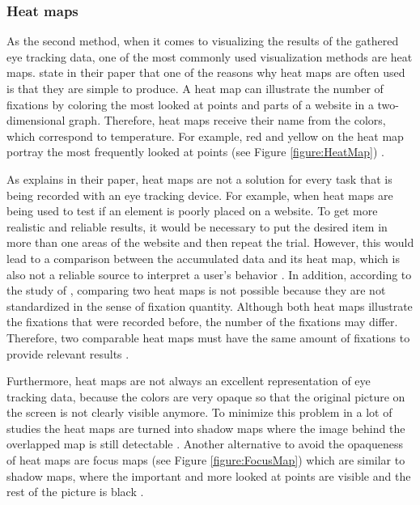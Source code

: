\subsubsection{Heat maps}
As the second method, when it comes to visualizing the results of the gathered eye tracking data, one of the most commonly used visualization methods are heat maps. 
\textcite{bojko2009informative} state in their paper that one of the reasons why heat maps are often used is that they are simple to produce. 
A heat map can illustrate the number of fixations by coloring the most looked at points and parts of a website in a two-dimensional graph. Therefore, heat maps receive their name from the colors, which correspond to temperature. For example, red and yellow on the heat map portray the most frequently looked at points (see Figure \ref{figure:HeatMap}) \autocite[]{bojko2009informative}. 

As \textcite[]{bojko2009informative} explains in their paper, heat maps are not a solution for every task that is being recorded with an eye tracking device. 
For example, when heat maps are being used to test if an element is poorly placed on a website. To get more realistic and reliable results, it would be necessary to put the desired item in more than one areas of the website and then repeat the trial. However, this would lead to a comparison between the accumulated data and its heat map, which is also not a reliable source to interpret a user's behavior \autocite[]{bojko2009informative}. 
In addition, according to the study of \textcite[]{djamasbi2010efficiency}, comparing two heat maps is not possible because they are not standardized in the sense of fixation quantity. Although both heat maps illustrate the fixations that were recorded before, the number of the fixations may differ. Therefore, two comparable heat maps must have the same amount of fixations to provide relevant results \autocite[]{djamasbi2010efficiency}. 

Furthermore, heat maps are not always an excellent representation of eye tracking data, because the colors are very opaque so that the original picture on the screen is not clearly visible anymore. To minimize this problem in a lot of studies the heat maps are turned into shadow maps where the image behind the overlapped map is still detectable \autocite[]{vspakov2007visualization}. Another alternative to avoid the opaqueness of heat maps are focus maps (see Figure \ref{figure:FocusMap}) which are similar to shadow maps, where the important and more looked at points are visible and the rest of the picture is black \autocite{kruger2014subtitles}.

